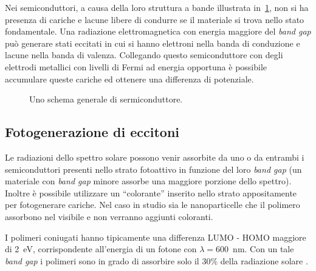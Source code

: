 Nei semiconduttori, a causa della loro struttura a bande illustrata in~\ref{fig:semicond-schema1}, non si ha presenza di cariche e lacune libere di condurre se il materiale si trova nello stato fondamentale. Una radiazione elettromagnetica con energia maggiore del \emph{band gap} può generare stati eccitati in cui si hanno elettroni nella banda di conduzione e lacune nella banda di valenza. Collegando questo semiconduttore con degli elettrodi metallici con livelli di Fermi ad energia opportuna è possibile accumulare queste cariche ed ottenere una differenza di potenziale.
\begin{figure}
\caption{\footnotesize{Uno schema generale di sermiconduttore.}
\label{fig:semicond-schema1}}
\end{figure}

\subsection{Fotogenerazione di eccitoni}
Le radiazioni dello spettro solare possono venir assorbite da uno o da entrambi i semiconduttori presenti nello strato fotoattivo in funzione del loro \emph{band gap} (un materiale con \emph{band gap} minore assorbe una maggiore porzione dello spettro). Inoltre è possibile utilizzare un ``colorante'' inserito nello strato appositamente per fotogenerare cariche. Nel caso in studio sia le nanoparticelle che il polimero assorbono nel visibile e non verranno aggiunti coloranti. 
        

I polimeri coniugati hanno tipicamente una differenza LUMO - HOMO maggiore di 2~eV, corrispondente all'energia di un fotone con $\lambda=600$~nm. Con un tale \emph{band gap} i polimeri sono in grado di assorbire solo il 30\% della radiazione solare \cite{fv-eccit}. 
        

